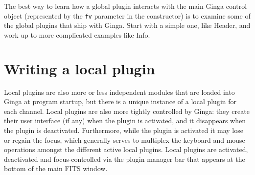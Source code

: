 \documentclass[11pt]{report}
\begin{document}
The best way to learn how a global plugin interacts with the main Ginga
control object (represented by the {\tt fv} parameter in the
constructor) is to examine some of the global plugins that ship with
Ginga.  Start with a simple one, like Header, and work up to more
complicated examples like Info.

\section{Writing a local plugin}
\label{sec:localplugins}
Local plugins are also more or less independent modules that are loaded
into Ginga at program startup, but there is a unique instance of a local
plugin for each channel.  Local plugins are also more tightly controlled
by Ginga: they create their user interface (if any) when the plugin
is activated, and it disappears when the plugin is deactivated.
Furthermore, while the plugin is activated it may lose or regain the
focus, which generally serves to multiplex the keyboard and mouse
operations amongst the different active local plugins.  
Local plugins are activated, deactivated and focus-controlled via the 
plugin manager bar that appears at the bottom of the main FITS window.
\end{document}
